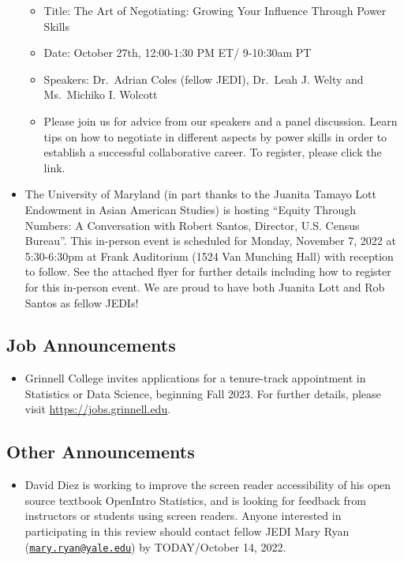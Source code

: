 \documentclass[
  letterpaper,
  DIV=11,
  numbers=noendperiod,
  oneside]{scrartcl}
\providecommand{\tightlist}{%
  \setlength{\itemsep}{0pt}\setlength{\parskip}{0pt}}\usepackage{longtable,booktabs,array}
\begin{document}
\begin{itemize}
  \begin{itemize}
  \tightlist
  \item
    Title: The Art of Negotiating: Growing Your Influence Through Power
    Skills
  \item
    Date: October 27th, 12:00-1:30 PM ET/ 9-10:30am PT
  \item
    Speakers: Dr.~Adrian Coles (fellow JEDI), Dr.~Leah J. Welty and
    Ms.~Michiko I. Wolcott
  \item
    Please join us for advice from our speakers and a panel discussion.
    Learn tips on how to negotiate in different aspects by power skills
    in order to establish a successful collaborative career. To
    register, please click the link.
  \end{itemize}
\item
  The University of Maryland (in part thanks to the Juanita Tamayo Lott
  Endowment in Asian American Studies) is hosting ``Equity Through
  Numbers: A Conversation with Robert Santos, Director, U.S. Census
  Bureau''. This in-person event is scheduled for Monday, November 7,
  2022 at 5:30-6:30pm at Frank Auditorium (1524 Van Munching Hall) with
  reception to follow. See the attached flyer for further details
  including how to register for this in-person event. We are proud to
  have both Juanita Lott and Rob Santos as fellow JEDIs!
\end{itemize}

\hypertarget{job-announcements}{%
\subsection{Job Announcements}\label{job-announcements}}

\begin{itemize}
\tightlist
\item
  Grinnell College invites applications for a tenure-track appointment
  in Statistics or Data Science, beginning Fall 2023. For further
  details, please visit \url{https://jobs.grinnell.edu}.
\end{itemize}

\hypertarget{other-announcements}{%
\subsection{Other Announcements}\label{other-announcements}}

\begin{itemize}
\tightlist
\item
  David Diez is working to improve the screen reader accessibility of
  his open source textbook OpenIntro Statistics, and is looking for
  feedback from instructors or students using screen readers. Anyone
  interested in participating in this review should contact fellow JEDI
  Mary Ryan
  (\href{mailto:mary.ryan@yale.edu}{\nolinkurl{mary.ryan@yale.edu}}) by
  TODAY/October 14, 2022.
\end{itemize}
\end{document}
